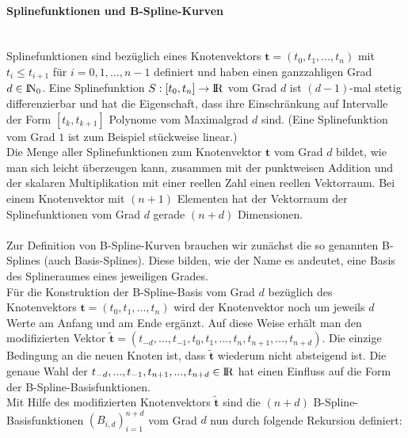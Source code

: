 \paragraph{Splinefunktionen und B-Spline-Kurven}~\\
Splinefunktionen sind bezüglich eines Knotenvektors $\mathbf{t}=(t_0,t_1,...,t_n)$ mit $t_i \le t_{i+1}$ für $i=0,1,...,n-1$ definiert und haben einen ganzzahligen Grad $d\in{\rm I\!N}_0$. Eine Splinefunktion $S:[t_0,t_n]\rightarrow{\rm I\!R}$ vom Grad $d$ ist $(d-1)$-mal stetig differenzierbar und hat die Eigenschaft, dass ihre Einschränkung auf Intervalle der Form $[t_k,t_{k+1}]$ Polynome vom Maximalgrad $d$ sind. (Eine Splinefunktion vom Grad $1$ ist zum Beispiel stückweise linear.)\\
Die Menge aller Splinefunktionen zum Knotenvektor $\mathbf{t}$ vom Grad $d$
bildet, wie man sich leicht überzeugen kann, zusammen mit der punktweisen Addition und der skalaren Multiplikation mit einer reellen Zahl einen reellen Vektorraum. Bei einem Knotenvektor mit $(n+1)$ Elementen hat der Vektorraum der Splinefunktionen vom Grad $d$ gerade $(n+d)$ Dimensionen.\\
\\
Zur Definition von B-Spline-Kurven brauchen wir zunächst die so genannten B-Splines (auch Basis-Splines). Diese bilden, wie der Name es andeutet, eine Basis des Splineraumes eines jeweiligen Grades.\\
Für die Konstruktion der B-Spline-Basis vom Grad $d$ bezüglich des Knotenvektors $\mathbf{t}=(t_0,t_1,...,t_n)$ wird der Knotenvektor noch um jeweils $d$ Werte am Anfang und am Ende ergänzt. Auf diese Weise erhält man den modifizierten Vektor $\mathbf{\tilde{t}}=(t_{-d},...,t_{-1},t_0,t_1,...,t_n,t_{n+1},...,t_{n+d})$. Die einzige Bedingung an die neuen Knoten ist, dass $\mathbf{\tilde{t}}$ wiederum nicht absteigend ist. Die genaue Wahl der $t_{-d},...,t_{-1},t_{n+1},...,t_{n+d}\in{\rm I\!R}$ hat einen Einfluss auf die Form der B-Spline-Basisfunktionen.\\
Mit Hilfe des modifizierten Knotenvektors $\mathbf{\tilde{t}}$ sind die $(n+d)$ B-Spline-Basisfunktionen $(B_{i,d})_{i=1}^{n+d}$ vom Grad $d$ nun durch folgende Rekursion definiert:
